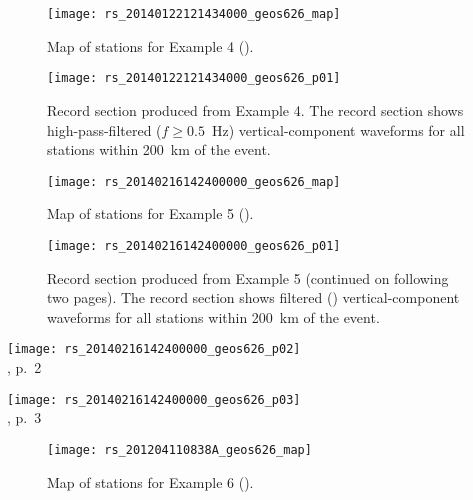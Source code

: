 \documentclass[11pt,titlepage,fleqn]{article}
\begin{document}
\clearpage\pagebreak
\begin{figure}
\centering
\texttt{[image: rs\_20140122121434000\_geos626\_map]}
\caption[]
{{
Map of stations for Example 4 ().
}}
\label{fig:map_ex04}
\end{figure}

\clearpage\pagebreak
\begin{figure}
\hspace{-1.25cm}
\texttt{[image: rs\_20140122121434000\_geos626\_p01]}
\caption[]
{{
Record section produced from Example 4.
The record section shows high-pass-filtered ($f \ge 0.5$~Hz) vertical-component waveforms for all stations within 200~km of the event.
}}
\label{fig:rs_ex04}
\end{figure}


\clearpage\pagebreak
\begin{figure}
\centering
\texttt{[image: rs\_20140216142400000\_geos626\_map]}
\caption[]
{{
Map of stations for Example 5 ().
}}
\label{fig:map_ex05}
\end{figure}

\clearpage\pagebreak
\begin{figure}
\hspace{-1cm}
\texttt{[image: rs\_20140216142400000\_geos626\_p01]}
\caption[]
{{
Record section produced from Example 5 (continued on following two pages).
The record section shows filtered () vertical-component waveforms for all stations within 200~km of the event.
}}
\label{fig:rs_ex05}
\end{figure}

\clearpage\pagebreak
\hspace{-1.25cm}
\texttt{[image: rs\_20140216142400000\_geos626\_p02]} \\
, p.~2

\clearpage\pagebreak
\hspace{-1.25cm}
\texttt{[image: rs\_20140216142400000\_geos626\_p03]} \\
, p.~3


\clearpage\pagebreak
\begin{figure}
\centering
\texttt{[image: rs\_201204110838A\_geos626\_map]}
\caption[]
{{
Map of stations for Example 6 ().
}}
\label{fig:map_ex06}
\end{figure}
\end{document}
